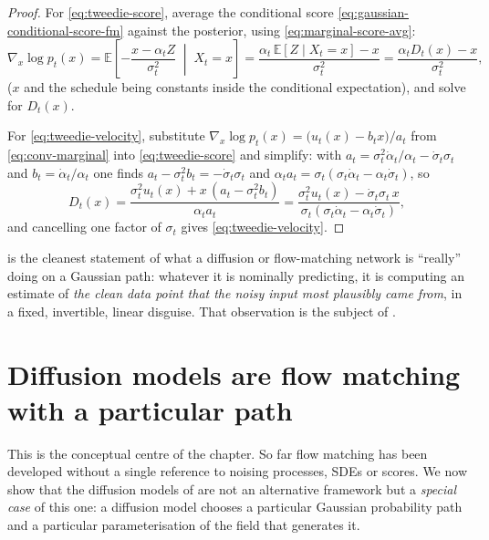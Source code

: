 \documentclass[11pt,a4paper]{report}
\theoremstyle{definition}
\theoremstyle{remark}
\newcommand{\EE}{\mathbb E}
\begin{document}
\begin{proof}
For \eqref{eq:tweedie-score}, average the conditional score
\eqref{eq:gaussian-conditional-score-fm} against the posterior, using
\eqref{eq:marginal-score-avg}:
\[
\nabla_x\log p_t(x)
= \EE\left[-\frac{x-\alpha_tZ}{\sigma_t^2}\;\middle|\;X_t=x\right]
= \frac{\alpha_t\,\EE[Z\mid X_t=x]-x}{\sigma_t^2}
= \frac{\alpha_tD_t(x)-x}{\sigma_t^2} ,
\]
($x$ and the schedule being constants inside the conditional expectation),
and solve for $D_t(x)$.

For \eqref{eq:tweedie-velocity}, substitute
$\nabla_x\log p_t(x) = \bigl(u_t(x)-b_tx\bigr)/a_t$ from
\eqref{eq:conv-marginal} into \eqref{eq:tweedie-score} and simplify:
with $a_t=\sigma_t^2\dot\alpha_t/\alpha_t-\dot\sigma_t\sigma_t$ and
$b_t=\dot\alpha_t/\alpha_t$ one finds $a_t-\sigma_t^2b_t = -\dot\sigma_t\sigma_t$
and $\alpha_ta_t = \sigma_t(\sigma_t\dot\alpha_t-\alpha_t\dot\sigma_t)$, so
\[
D_t(x)
= \frac{\sigma_t^2u_t(x) + x\,(a_t-\sigma_t^2b_t)}{\alpha_ta_t}
= \frac{\sigma_t^2u_t(x) - \dot\sigma_t\sigma_t\,x}{\sigma_t(\sigma_t\dot\alpha_t-\alpha_t\dot\sigma_t)} ,
\]
and cancelling one factor of $\sigma_t$ gives \eqref{eq:tweedie-velocity}.
\end{proof}

 is the cleanest statement of what a diffusion or
flow-matching network is ``really'' doing on a Gaussian path: whatever it
is nominally predicting, it is computing an estimate of
\emph{the clean data point that the noisy input most plausibly came from},
in a fixed, invertible, linear disguise. That observation is the subject of
.

\section{Diffusion models are flow matching with a particular path}
\label{sec:diffusion-as-path}

This is the conceptual centre of the chapter. So far flow matching has been
developed without a single reference to noising processes, SDEs or scores.
We now show that the diffusion models of  are
not an alternative framework but a \emph{special case} of this one: a
diffusion model chooses a particular Gaussian probability path and a
particular parameterisation of the field that generates it.
\end{document}

